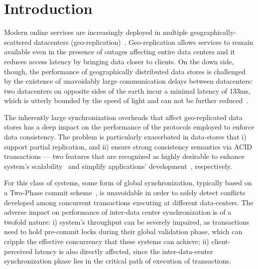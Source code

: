 \section{Introduction}
\label{sec:introduction}


Modern online services are increasingly deployed in multiple geographically-scattered datacenters (geo-replication)~\cite{spanner, kraska2013mdcc, li2012making}. Geo-replication allows services to remain available even in the presence of outages affecting entire data centers  and it reduces access latency by bringing data closer to clients. On the down side, though, the performance of geographically distributed data stores is challenged by the existence of unavoidably large communication delays between datacenters: two datacenters on opposite sides of the earth incur a minimal latency of 133ms, which is utterly bounded by the speed of light and can not be further reduced~\cite{bailis2013highly}. 

The inherently large synchronization overheads that affect geo-replicated data stores has a deep impact on the performance of the protocols employed to enforce data consistency. The problem is particularly exacerbated in  data-stores that i) support partial replication, and ii) ensure strong consistency semantics via ACID transactions --- two features that are recognized as highly desirable to enhance system's scalability~\cite{bettina-partial} and simplify applications' development~\cite{shute2013f1}, respectively. 

For this class of systems, some form of global synchronization, typically based on a Two-Phase commit scheme~\cite{bernstein1987concurrency}, is unavoidable in order to safely detect conflicts developed among  concurrent transactions executing at different data-centers. The adverse impact on performance of inter-data center synchronization is of a twofold nature: i) system's throughput can be severely impaired, as  transactions need to hold pre-commit locks during their global validation phase, which can cripple the effective concurrency that these systems can achieve; ii) client-perceived latency is also directly affected, since the inter-data-center  synchronization phase lies in the critical path of execution of transactions.



